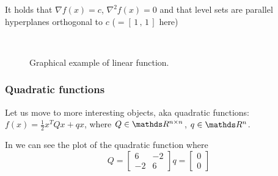 \documentclass[computationalMathematics.tex]{subfiles}
\begin{document}
It holds that $\nabla f(x) = c$, $\nabla^2 f(x) = 0$ and that level sets are parallel hyperplanes orthogonal to $c$ ($= [ \, 1 \,,\, 1 \, ]$ here)

\begin{figure}[h]
  \centering
  \hspace{0.5cm}
  \\
  \caption{Graphical example of linear function.}\label{fig:3ott_1}
\end{figure}

\subsubsection{Quadratic functions}
Let us move to more interesting objects, aka quadratic functions: $f(x) = \frac{1}{2} x^T Q x + qx$, where $Q \in \R^{n\times n}$, $q \in \R^n$.

In  we can see the plot of the quadratic function where 
\[
  Q = \left[\begin{array}{rr} 6 & -2 \\ -2 & 6 \end{array}\right]
  q = \left[\begin{array}{rr} 0 \\ 0 \end{array}\right]
\]
\end{document}
